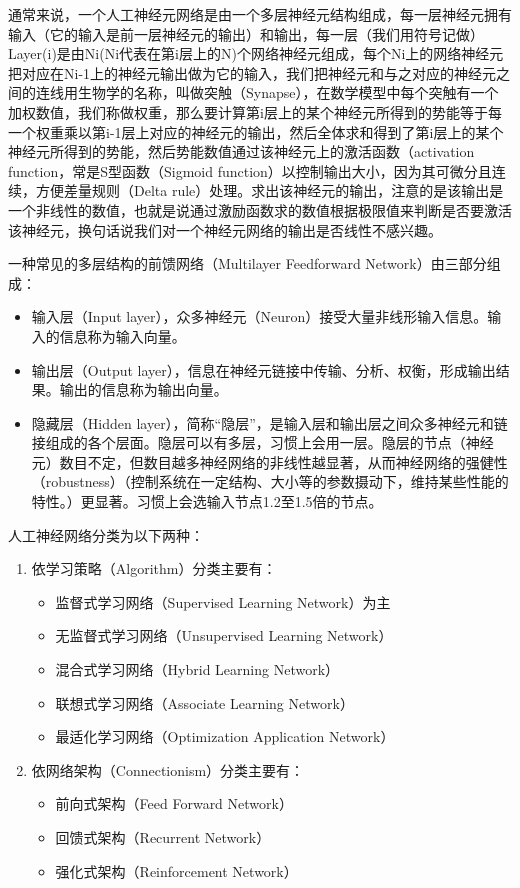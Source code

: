 \documentclass[11pt,a4paper,twoside]{book}
\begin{document}
通常来说，一个人工神经元网络是由一个多层神经元结构组成，每一层神经元拥有输入（它的输入是前一层神经元的输出）和输出，每一层（我们用符号记做）Layer(i)是由Ni(Ni代表在第i层上的N)个网络神经元组成，每个Ni上的网络神经元把对应在Ni-1上的神经元输出做为它的输入，我们把神经元和与之对应的神经元之间的连线用生物学的名称，叫做突触（Synapse），在数学模型中每个突触有一个加权数值，我们称做权重，那么要计算第i层上的某个神经元所得到的势能等于每一个权重乘以第i-1层上对应的神经元的输出，然后全体求和得到了第i层上的某个神经元所得到的势能，然后势能数值通过该神经元上的激活函数（activation function，常是S型函数（Sigmoid function）以控制输出大小，因为其可微分且连续，方便差量规则（Delta rule）处理。求出该神经元的输出，注意的是该输出是一个非线性的数值，也就是说通过激励函数求的数值根据极限值来判断是否要激活该神经元，换句话说我们对一个神经元网络的输出是否线性不感兴趣。

一种常见的多层结构的前馈网络（Multilayer Feedforward Network）由三部分组成：
\begin{itemize}
  \item 输入层（Input layer），众多神经元（Neuron）接受大量非线形输入信息。输入的信息称为输入向量。
  \item 输出层（Output layer），信息在神经元链接中传输、分析、权衡，形成输出结果。输出的信息称为输出向量。
  \item 隐藏层（Hidden layer），简称“隐层”，是输入层和输出层之间众多神经元和链接组成的各个层面。隐层可以有多层，习惯上会用一层。隐层的节点（神经元）数目不定，但数目越多神经网络的非线性越显著，从而神经网络的强健性（robustness）（控制系统在一定结构、大小等的参数摄动下，维持某些性能的特性。）更显著。习惯上会选输入节点1.2至1.5倍的节点。
\end{itemize}

人工神经网络分类为以下两种：
\begin{enumerate}
  \item 依学习策略（Algorithm）分类主要有：
    \begin{itemize}
      \item 监督式学习网络（Supervised Learning Network）为主
      \item 无监督式学习网络（Unsupervised Learning Network）
      \item 混合式学习网络（Hybrid Learning Network）
      \item 联想式学习网络（Associate Learning Network）
      \item 最适化学习网络（Optimization Application Network）
    \end{itemize}
  \item 依网络架构（Connectionism）分类主要有：
    \begin{itemize}
      \item 前向式架构（Feed Forward Network）
      \item 回馈式架构（Recurrent Network）
      \item 强化式架构（Reinforcement Network）
    \end{itemize}
\end{enumerate}
\end{document}
